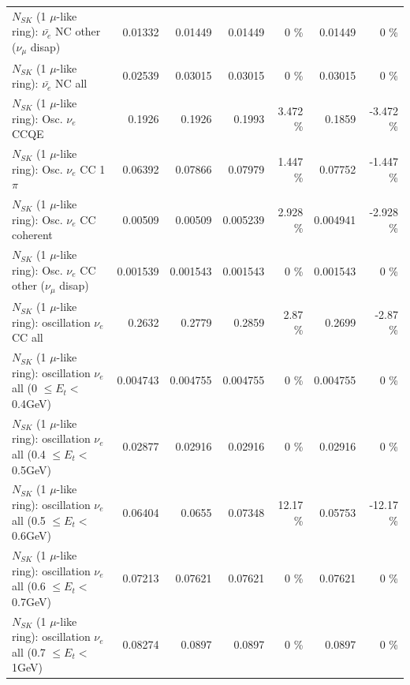 \begin{table}
\begin{tabular}{| l | r | r | r  r | r  r |}
          $N_{SK}$ (1 $\mu$-like ring): $\bar{\nu_e}$ NC other ($\nu_\mu$ disap) &         0.01332 &         0.01449 &         0.01449 &        0 \%  &         0.01449 &        0 \%  \\ 
                            $N_{SK}$ (1 $\mu$-like ring): $\bar{\nu_{e}}$ NC all &         0.02539 &         0.03015 &         0.03015 &        0 \%  &         0.03015 &        0 \%  \\ 
\hline
\hline
\hline
                                 $N_{SK}$ (1 $\mu$-like ring): Osc. $\nu_e$ CCQE &          0.1926 &          0.1926 &          0.1993 &    3.472 \%  &          0.1859 &   -3.472 \%  \\ 
                            $N_{SK}$ (1 $\mu$-like ring): Osc. $\nu_e$ CC 1$\pi$ &         0.06392 &         0.07866 &         0.07979 &    1.447 \%  &         0.07752 &   -1.447 \%  \\ 
                          $N_{SK}$ (1 $\mu$-like ring): Osc. $\nu_e$ CC coherent &         0.00509 &         0.00509 &        0.005239 &    2.928 \%  &        0.004941 &   -2.928 \%  \\ 
           $N_{SK}$ (1 $\mu$-like ring): Osc. $\nu_e$ CC other ($\nu_\mu$ disap) &        0.001539 &        0.001543 &        0.001543 &        0 \%  &        0.001543 &        0 \%  \\ 
                        $N_{SK}$ (1 $\mu$-like ring): oscillation $\nu_e$ CC all &          0.2632 &          0.2779 &          0.2859 &     2.87 \%  &          0.2699 &    -2.87 \%  \\ 
\hline
$N_{SK}$ (1 $\mu$-like ring): oscillation $\nu_{e}$ all (0 $\leq E_{t} <$ 0.4GeV) &        0.004743 &        0.004755 &        0.004755 &        0 \%  &        0.004755 &        0 \%  \\ 
$N_{SK}$ (1 $\mu$-like ring): oscillation $\nu_{e}$ all (0.4 $\leq E_{t} <$ 0.5GeV) &         0.02877 &         0.02916 &         0.02916 &        0 \%  &         0.02916 &        0 \%  \\ 
$N_{SK}$ (1 $\mu$-like ring): oscillation $\nu_{e}$ all (0.5 $\leq E_{t} <$ 0.6GeV) &         0.06404 &          0.0655 &         0.07348 &    12.17 \%  &         0.05753 &   -12.17 \%  \\ 
$N_{SK}$ (1 $\mu$-like ring): oscillation $\nu_{e}$ all (0.6 $\leq E_{t} <$ 0.7GeV) &         0.07213 &         0.07621 &         0.07621 &        0 \%  &         0.07621 &        0 \%  \\ 
$N_{SK}$ (1 $\mu$-like ring): oscillation $\nu_{e}$ all (0.7 $\leq E_{t} <$ 1GeV) &         0.08274 &          0.0897 &          0.0897 &        0 \%  &          0.0897 &        0 \%  \\ 

\end{tabular}
\end{table}
